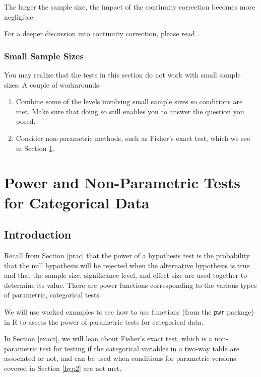 \documentclass[
]{book}
\theoremstyle{definition}
\theoremstyle{definition}
\theoremstyle{definition}
\theoremstyle{definition}
\theoremstyle{remark}
\begin{document}
The larger the sample size, the impact of the continuity correction becomes more negligible.

For a deeper discussion into continuity correction, please read \citet{continue}.

\hypertarget{small-sample-sizes}{%
\subsection{Small Sample Sizes}\label{small-sample-sizes}}

You may realize that the tests in this section do not work with small sample sizes. A couple of workarounds:

\begin{enumerate}
\def\labelenumi{\arabic{enumi}.}
\item
  Combine some of the levels involving small sample sizes so conditions are met. Make sure that doing so still enables you to answer the question you posed.
\item
  Consider non-parametric methods, such as Fisher's exact test, which we see in Section \ref{nonparamcat}.
\end{enumerate}

\hypertarget{nonparamcat}{%
\chapter{Power and Non-Parametric Tests for Categorical Data}\label{nonparamcat}}

\hypertarget{introduction-9}{%
\section{Introduction}\label{introduction-9}}

Recall from Section \ref{prac} that the power of a hypothesis test is the probability that the null hypothesis will be rejected when the alternative hypothesis is true and that the sample size, significance level, and effect size are used together to determine its value. There are power functions corresponding to the various types of parametric, categorical tests.

We will use worked examples to see how to use functions (from the \texttt{pwr} package) in R to assess the power of parametric tests for categorical data.

In Section \ref{exact}, we will lean about Fisher's exact test, which is a non-parametric test for testing if the categorical variables in a two-way table are associated or not, and can be used when conditions for parametric versions covered in Section \ref{hyp2} are not met.
\end{document}
